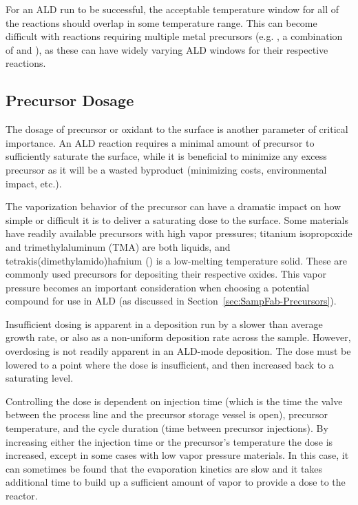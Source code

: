 For an ALD run to be successful, the acceptable temperature window for all of the reactions should overlap in some temperature range. This can become difficult with reactions requiring multiple metal precursors (e.g. \PTO, a combination of  and ), as these can have widely varying ALD windows for their respective reactions. 


\subsection{Precursor Dosage}

The dosage of precursor or oxidant to the surface is another parameter of critical importance. An ALD reaction requires a minimal amount of precursor to sufficiently saturate the surface, while it is beneficial to minimize any excess precursor as it will be a wasted byproduct (minimizing costs, environmental impact, etc.). 

The vaporization behavior of the precursor can have a dramatic impact on how simple or difficult it is to deliver a saturating dose to the surface. Some materials have readily available precursors with high vapor pressures; titanium isopropoxide and trimethylaluminum (TMA) are both liquids, and tetrakis(dimethylamido)hafnium () is a low-melting temperature solid. These are commonly used precursors for depositing their respective oxides. This vapor pressure becomes an important consideration when choosing a potential compound for use in ALD (as discussed in Section~\vref{sec:SampFab-Precursors}).\cite{ALD-Handbook,kanjolia_design_2008,Leskela_2002,lim_atomic_2003,Ritala_ALD_2003}

Insufficient dosing is apparent in a deposition run by a slower than average growth rate, or also as a non-uniform deposition rate across the sample. However, overdosing is not readily apparent in an ALD-mode deposition. The dose must be lowered to a point where the dose is insufficient, and then increased back to a saturating level. 

Controlling the dose is dependent on injection time (which is the time the valve between the process line and the precursor storage vessel is open), precursor temperature, and the cycle duration (time between precursor injections). By increasing either the injection time or the precursor's temperature the dose is increased, except in some cases with low vapor pressure materials. In this case, it can sometimes be found that the evaporation kinetics are slow and it takes additional time to build up a sufficient amount of vapor to provide a dose to the reactor.\cite{ALD-Handbook,lim_atomic_2003,Ritala_ALD_2003} 

